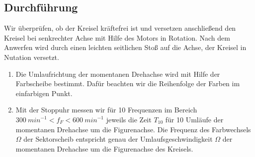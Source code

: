\documentclass[a4paper,10pt]{article}
\begin{document}
\subsection[Durchführung]{Durchführung\fnrefb}
Wir überprüfen, ob der Kreisel kräftefrei ist und versetzen anschließend
den Kreisel bei senkrechter Achse mit Hilfe des Motors in Rotation. Nach dem
Anwerfen wird durch einen leichten seitlichen Stoß auf die Achse, der Kreisel in
Nutation versetzt.
\begin{enumerate}[label=(\alph*)]
\item Die Umlaufrichtung der momentanen Drehachse wird mit
Hilfe der Farbscheibe bestimmt. Dafür beachten wir die Reihenfolge der Farben im einfarbigen Punkt.

\item Mit der Stoppuhr messen wir für 10 Frequenzen im Bereich \(300 \:{min}^{-1} < f_F < 600\:{min}^{-1}\) jeweils die Zeit \(T_{10}\) für 10 Umläufe der momentanen Drehachse um die Figurenachse. Die Frequenz des Farbwechsels \(\Omega\) der Sektorscheib entspricht genau der
Umlaufsgeschwindigkeit \(\Omega\) der momentanen Drehachse um die Figurenachse des Kreisels.
\end{enumerate}
\end{document}
